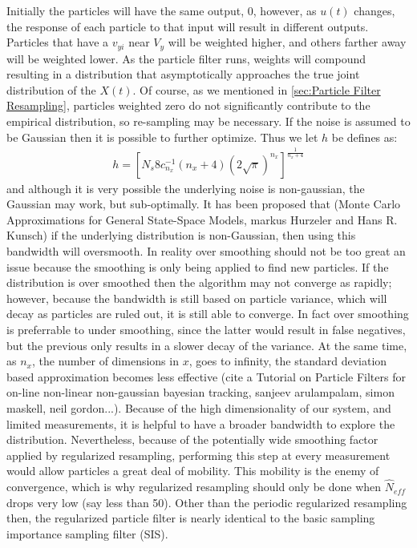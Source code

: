 Initially the particles will have the same output, $0$, however, as $u(t)$
changes, the response of each particle to that input will result in different
outputs. Particles that have a $v_{yi}$ near $V_y$ will be weighted higher,
and others farther away will be weighted lower. As the particle filter
runs, weights will compound resulting in a distribution that asymptotically
approaches the true joint distribution of the $X(t)$.  Of course, as we
mentioned in \autoref{sec:Particle Filter Resampling}, particles weighted zero do not significantly
contribute to the empirical distribution, so re-sampling may be necessary.
If the noise is assumed to be Gaussian then it is possible to further optimize. 
Thus we let $h$ be defines as:
\begin{eqnarray}
h = [N_s8c^{-1}_{n_x}(n_x + 4)(2\sqrt{\pi})^{n_x}]^{\frac{1}{n_x +4}}
\end{eqnarray}
and although it is very possible the underlying noise is non-gaussian, the Gaussian
may work, but sub-optimally. It has been proposed that (Monte Carlo Approximations for
General State-Space Models, markus Hurzeler and Hans R. Kunsch) if the underlying 
distribution is non-Gaussian, then using this bandwidth will oversmooth. 
In reality over smoothing
should not be too great an issue because the smoothing is only being applied to find new
particles. If the distribution is over smoothed then the algorithm may not converge as rapidly;
however, because the bandwidth is still based on particle variance, which will decay as 
particles are ruled out, it is still able to converge. In fact over smoothing is preferrable
to under smoothing, since the latter would result in false negatives, but the previous only
results in a slower decay of the variance. 
At the same time, as $n_x$, the number of dimensions in
$x$, goes to infinity, the standard deviation based approximation becomes less effective
(cite a Tutorial on Particle Filters for on-line non-linear non-gaussian bayesian
tracking, sanjeev arulampalam, simon maskell, neil gordon...).  Because of the high dimensionality of our system,
and limited measurements, it is helpful to have a broader bandwidth to explore the distribution. 
Nevertheless, because 
of the potentially wide smoothing factor applied by regularized resampling, performing this
step at every measurement would allow particles a great deal of mobility. This mobility is
the enemy of convergence, which is why regularized resampling should only be done when
$\hat{N}_{eff}$ drops very low (say less than 50). Other than the periodic regularized
resampling then, the regularized particle filter is nearly identical to the basic sampling
importance sampling filter (SIS). 

